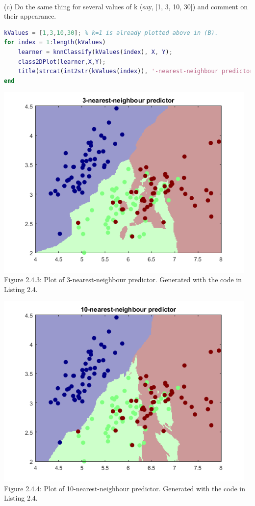 \documentclass[]{report}   %
\begin{document}
~\\
(c) Do the same thing for several values of k (say, [1, 3, 10, 30]) and comment on their appearance.
\begin{lstlisting}[language=Matlab, caption=Teaching k-nearest-neighbour predictor for multiple values of k. {\bf Note:} figure for 1-nearest-neighbour predictor is above in part (b).]
kValues = [1,3,10,30]; % k=1 is already plotted above in (B).
for index = 1:length(kValues)
    learner = knnClassify(kValues(index), X, Y);
    class2DPlot(learner,X,Y);
    title(strcat(int2str(kValues(index)), '-nearest-neighbour predictor'));
end
\end{lstlisting}
\begin{center}
	\includegraphics[width=35em]{2_4_Figure_3.png}
	{Figure 2.4.3: Plot of 3-nearest-neighbour predictor. Generated with the code in Listing 2.4.}
\end{center} 
\begin{center}
	\includegraphics[width=35em]{2_4_Figure_4.png}
	{Figure 2.4.4: Plot of 10-nearest-neighbour predictor. Generated with the code in Listing 2.4.}
\end{center} 
\end{document}
